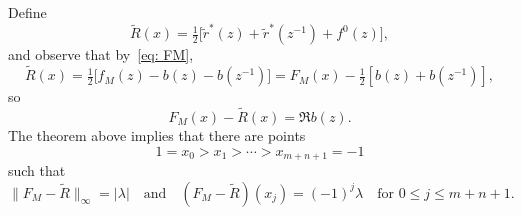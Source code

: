 \documentclass[12pt,a4paper]{article}
\begin{document}
Define
\[
\tilde R(x)=\tfrac12\bigl[\tilde r^*(z)+\tilde r^*(z^{-1})+f^0(z)\bigr],
\]
and observe that by~\eqref{eq: FM},
\[
\tilde R(x)=\tfrac12\bigl[f_M(z)-b(z)-b(z^{-1})\bigr]
    =F_M(x)-\tfrac12[b(z)+b(z^{-1})],
\]
so
\[
F_M(x)-\tilde R(x)=\Re b(z).
\]
The theorem above implies that there are points
\[
1=x_0>x_1>\cdots>x_{m+n+1}=-1
\]
such that
\[
\|F_M-\tilde R\|_\infty=|\lambda|\quad\text{and}\quad
(F_M-\tilde R)(x_j)=(-1)^j\lambda\quad\text{for $0\le j\le m+n+1$.}
\]








\printbibliography
\end{document}
